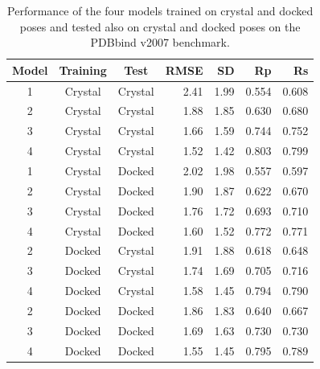 \begin{table}
\caption{Performance of the four models trained on crystal and docked poses and tested also on crystal and docked poses on the PDBbind v2007 benchmark.}
\label{rfscore4:tbl-set-1-pdbbind-2007}
\begin{tabular}{cccrrrr}
\hline
Model & Training & Test & RMSE & SD & Rp & Rs\\
\hline
1 & Crystal & Crystal & 2.41 & 1.99 & 0.554 & 0.608\\
2 & Crystal & Crystal & 1.88 & 1.85 & 0.630 & 0.680\\
3 & Crystal & Crystal & 1.66 & 1.59 & 0.744 & 0.752\\
4 & Crystal & Crystal & 1.52 & 1.42 & 0.803 & 0.799\\
\hline
1 & Crystal & Docked  & 2.02 & 1.98 & 0.557 & 0.597\\
2 & Crystal & Docked  & 1.90 & 1.87 & 0.622 & 0.670\\
3 & Crystal & Docked  & 1.76 & 1.72 & 0.693 & 0.710\\
4 & Crystal & Docked  & 1.60 & 1.52 & 0.772 & 0.771\\
\hline
2 & Docked  & Crystal & 1.91 & 1.88 & 0.618 & 0.648\\
3 & Docked  & Crystal & 1.74 & 1.69 & 0.705 & 0.716\\
4 & Docked  & Crystal & 1.58 & 1.45 & 0.794 & 0.790\\
\hline
2 & Docked  & Docked  & 1.86 & 1.83 & 0.640 & 0.667\\
3 & Docked  & Docked  & 1.69 & 1.63 & 0.730 & 0.730\\
4 & Docked  & Docked  & 1.55 & 1.45 & 0.795 & 0.789\\
\hline
\end{tabular}
\end{table}

